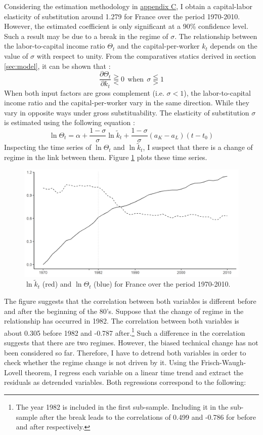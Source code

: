 Considering the estimation methodology in \hyperref[appendix:sigma]{appendix C}, I obtain a capital-labor elasticity of substitution around 1.279 for France over the period 1970-2010. However, the estimated coefficient is only significant at a 90\% confidence level. Such a result may be due to a break in the regime of $\sigma$. The relationship between the labor-to-capital income ratio $\Theta_t$ and the capital-per-worker $k_t$ depends on the value of $\sigma$ with respect to unity. From the comparatives statics derived in section \ref{sec:model}, it can be shown that :
\begin{equation*}
	\frac{\partial \Theta_t}{\partial k_t} \gtreqqless 0 ~~ \text{when} ~~ \sigma \lesseqqgtr 1
\end{equation*}
When both input factors are gross complement (i.e. $\sigma < 1$), the labor-to-capital income ratio and the capital-per-worker vary in the same direction. While they vary in opposite ways under gross substituability. The elasticity of substitution $\sigma$ is estimated using the following equation :
\begin{equation*}
\ln \Theta_t = \alpha + \frac{1-\sigma}{\sigma} \ln \tilde{k}_t + \frac{1-\sigma}{\sigma}(a_K-a_L)\left(t-t_0\right)
\end{equation*}
Inspecting the time series of $\ln \Theta_t$ and $\ln \tilde{k}_t$, I suspect that there is a change of regime in the link between them. Figure \ref{fig:k_Theta_log} plots these time series.
\begin{figure}[tb]
	\centering
	\includegraphics[width=1\linewidth]{../result/appendix_CD/k_Theta_log.png}
	\caption{$\ln \tilde{k}_t$ (red) and $\ln \Theta_t$ (blue) for France over the period 1970-2010.}
	\label{fig:k_Theta_log}
\end{figure}
The figure suggests that the correlation between both variables is different before and after the beginning of the 80's. Suppose that the change of regime in the relationship has occurred in 1982. The correlation between both variables is about 0.305 before 1982 and -0.787 after.\footnote{The year 1982 is included in the first sub-sample. Including it in the sub-sample after the break leads to the correlations of 0.499 and -0.786 for before and after respectively.} Such a difference in the correlation suggests that there are two regimes. However, the biased technical change has not been considered so far. Therefore, I have to detrend both variables in order to check whether the regime change is not driven by it. Using the Frisch-Waugh-Lovell theorem, I regress each variable on a linear time trend and extract the residuals as detrended variables. Both regressions correspond to the following:
